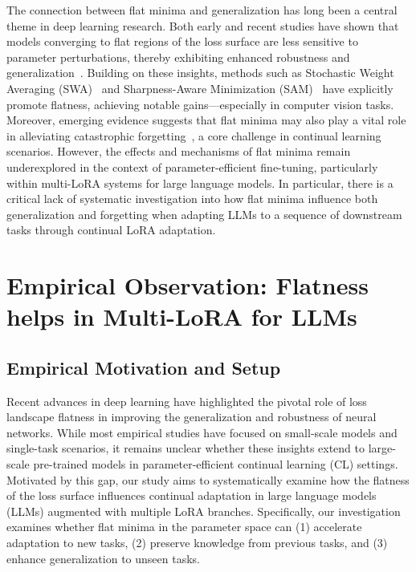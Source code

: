 \documentclass[letterpaper]{article} %
\begin{document}
The connection between flat minima and generalization has long been a central theme in deep learning research. Both early and recent studies have shown that models converging to flat regions of the loss surface are less sensitive to parameter perturbations, thereby exhibiting enhanced robustness and generalization~. Building on these insights, methods such as Stochastic Weight Averaging (SWA)~ and Sharpness-Aware Minimization (SAM)~ have explicitly promote flatness, achieving notable gains—especially in computer vision tasks. Moreover, emerging evidence suggests that flat minima may also play a vital role in alleviating catastrophic forgetting~\cite{mirzadehUnderstandingRoleTraining2020,JMLRAnEmpiricalInvestigatio}, a core challenge in continual learning scenarios. However, the effects and mechanisms of flat minima remain underexplored in the context of parameter-efficient fine-tuning, particularly within multi-LoRA systems for large language models. In particular, there is a critical lack of systematic investigation into how flat minima influence both generalization and forgetting when adapting LLMs to a sequence of downstream tasks through continual LoRA adaptation.




\section{Empirical Observation: Flatness helps in Multi-LoRA for LLMs}


\subsection{Empirical Motivation and Setup}

Recent advances in deep learning have highlighted the pivotal role of loss landscape flatness in improving the generalization and robustness of neural networks. While most empirical studies have focused on small-scale models and single-task scenarios, it remains unclear whether these insights extend to large-scale pre-trained models in parameter-efficient continual learning (CL) settings. Motivated by this gap, our study aims to systematically examine how the flatness of the loss surface influences continual adaptation in large language models (LLMs) augmented with multiple LoRA branches. Specifically,  our investigation examines whether flat minima in the parameter space can (1) accelerate adaptation to new tasks, (2) preserve knowledge from previous tasks, and (3) enhance generalization to unseen tasks.
\end{document}
